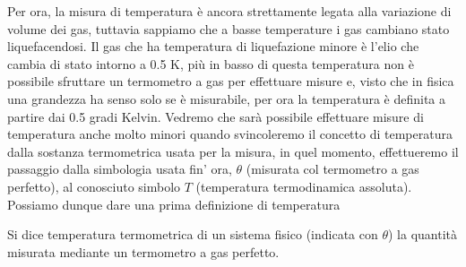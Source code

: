 \documentclass[
10pt, %
a4paper, %
oneside, %
headinclude,footinclude, %
BCOR5mm, %
]{scrartcl}
\begin{document}
\FloatBarrier
Per ora, la misura di temperatura è ancora strettamente legata alla variazione di volume dei gas, tuttavia sappiamo che a basse temperature i gas cambiano stato liquefacendosi. Il gas che ha temperatura di liquefazione minore è l'elio che cambia di stato intorno a 0.5 \textdegree K, più in basso di questa temperatura non è possibile sfruttare un termometro a gas per effettuare misure e, visto che in fisica una grandezza ha senso solo se è misurabile, per ora la temperatura è definita a partire dai 0.5 gradi Kelvin. Vedremo che sarà possibile effettuare misure di temperatura anche molto minori quando svincoleremo il concetto di temperatura dalla sostanza termometrica usata per la misura, in quel momento, effettueremo il passaggio dalla simbologia usata fin' ora, $\theta$ (misurata col termometro a gas perfetto), al conosciuto simbolo $T$ (temperatura termodinamica assoluta).\\
Possiamo dunque dare una prima definizione di temperatura
\begin{definition}
	Si dice temperatura termometrica di un sistema fisico (indicata con $\theta$) la quantità misurata mediante un termometro a gas perfetto.
\end{definition}
\newpage
\end{document}
